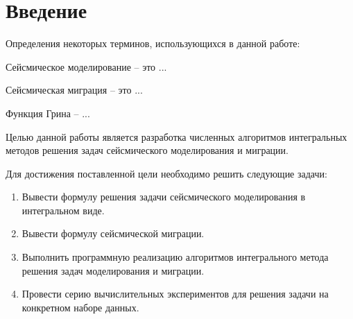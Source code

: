 \documentclass[a4paper, fontsize=14pt]{article}
\begin{document}
 
	\tableofcontents
	\newpage
	\section*{Введение} 

	Определения некоторых терминов, использующихся в данной работе:
	
	Сейсмическое моделирование -- это ...
	
	Сейсмическая миграция -- это ...
	
	Функция Грина -- ...
	
	
	Целью данной работы является разработка численных алгоритмов интегральных методов решения задач сейсмического моделирования и миграции. 
	
	Для достижения поставленной цели необходимо решить следующие задачи:
	\begin{enumerate}
		\item Вывести формулу решения задачи сейсмического моделирования в интегральном виде.
		\item Вывести формулу сейсмической миграции.
		\item Выполнить программную реализацию алгоритмов интегрального метода решения задач моделирования и миграции.
		\item Провести серию вычислительных экспериментов для решения задачи на конкретном наборе данных.
	\end{enumerate}
\end{document}

